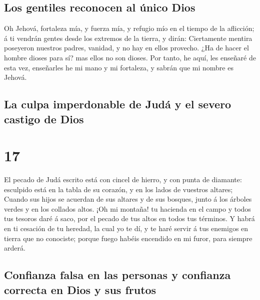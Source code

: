 \hypertarget{los-gentiles-reconocen-al-uxfanico-dios}{%
\subsection{Los gentiles reconocen al único
Dios}\label{los-gentiles-reconocen-al-uxfanico-dios}}

 Oh Jehová, fortaleza mía, y fuerza mía, y refugio mío en
el tiempo de la aflicción; á ti vendrán gentes desde los extremos de la
tierra, y dirán: Ciertamente mentira poseyeron nuestros padres, vanidad,
y no hay en ellos provecho.  ¿Ha de hacer el hombre
dioses para sí? mas ellos no son dioses.  Por tanto, he
aquí, les enseñaré de esta vez, enseñarles he mi mano y mi fortaleza, y
sabrán que mi nombre es Jehová.

\hypertarget{la-culpa-imperdonable-de-juduxe1-y-el-severo-castigo-de-dios}{%
\subsection{La culpa imperdonable de Judá y el severo castigo de
Dios}\label{la-culpa-imperdonable-de-juduxe1-y-el-severo-castigo-de-dios}}

\hypertarget{section-16}{%
\section{17}\label{section-16}}

 El pecado de Judá escrito está con cincel de hierro, y
con punta de diamante: esculpido está en la tabla de su corazón, y en
los lados de vuestros altares;  Cuando sus hijos se
acuerdan de sus altares y de sus bosques, junto á los árboles verdes y
en los collados altos.  ¡Oh mi montaña! tu hacienda en el
campo y todos tus tesoros daré á saco, por el pecado de tus altos en
todos tus términos.  Y habrá en ti cesación de tu heredad,
la cual yo te dí, y te haré servir á tus enemigos en tierra que no
conociste; porque fuego habéis encendido en mi furor, para siempre
arderá.

\hypertarget{confianza-falsa-en-las-personas-y-confianza-correcta-en-dios-y-sus-frutos}{%
\subsection{Confianza falsa en las personas y confianza correcta en Dios
y sus
frutos}\label{confianza-falsa-en-las-personas-y-confianza-correcta-en-dios-y-sus-frutos}}

